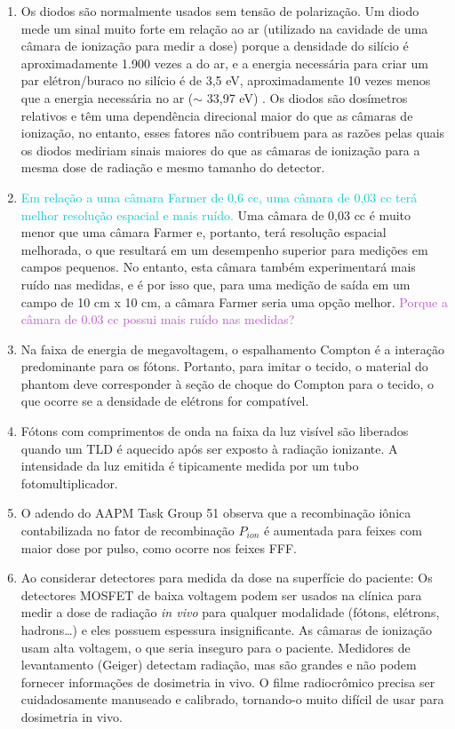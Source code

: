 \documentclass[11pt,a4paper]{article}
\begin{document}
\begin{enumerate}
        \item Os diodos são normalmente usados sem tensão de polarização. Um diodo mede um sinal muito forte em relação ao ar (utilizado na cavidade de uma câmara de ionização para medir a dose) porque a densidade do silício é aproximadamente 1.900 vezes a do ar, e a energia necessária para criar um par elétron/buraco no silício é de 3,5 eV, aproximadamente 10 vezes menos que a energia necessária no ar ($\sim$ 33,97 eV) . Os diodos são dosímetros relativos e têm uma dependência direcional maior do que as câmaras de ionização, no entanto, esses fatores não contribuem para as razões pelas quais os diodos mediriam sinais maiores do que as câmaras de ionização para a mesma dose de radiação e mesmo tamanho do detector. 

        \item \textcolor{DarkTurquoise}{Em relação a uma câmara Farmer de 0,6 cc, uma câmara de 0,03 cc terá melhor resolução espacial e mais ruído.} Uma câmara de 0,03 cc é muito menor que uma câmara Farmer e, portanto, terá resolução espacial melhorada, o que resultará em um desempenho superior para medições em campos pequenos. No entanto, esta câmara também experimentará mais ruído nas medidas, e é por isso que, para uma medição de saída em um campo de 10 cm x 10 cm, a câmara Farmer seria uma opção melhor. \textcolor{MediumOrchid}{Porque a câmara de 0.03 cc possui mais ruído nas medidas?}

        \item Na faixa de energia de megavoltagem, o espalhamento Compton é a interação predominante para os fótons. Portanto, para imitar o tecido, o material do phantom deve corresponder à seção de choque do Compton para o tecido, o que ocorre se a densidade de elétrons for compatível.

        \item Fótons com comprimentos de onda na faixa da luz visível são liberados quando um TLD é aquecido após ser exposto à radiação ionizante. A intensidade da luz emitida é tipicamente medida por um tubo fotomultiplicador.

        \item O adendo do AAPM Task Group 51 observa que a recombinação iônica contabilizada no fator de recombinação $P_{ion}$ é aumentada para feixes com maior dose por pulso, como ocorre nos feixes FFF.

        \item Ao considerar detectores para medida da dose na superfície do paciente: Os detectores MOSFET de baixa voltagem podem ser usados na clínica para medir a dose de radiação \textit{in vivo} para qualquer modalidade (fótons, elétrons, hadrons\dots) e eles possuem espessura insignificante. As câmaras de ionização usam alta voltagem, o que seria inseguro para o paciente. Medidores de levantamento (Geiger) detectam radiação, mas são grandes e não podem fornecer informações de dosimetria in vivo. O filme radiocrômico precisa ser cuidadosamente manuseado e calibrado, tornando-o muito difícil de usar para dosimetria in vivo.


\end{enumerate}
\end{document}
